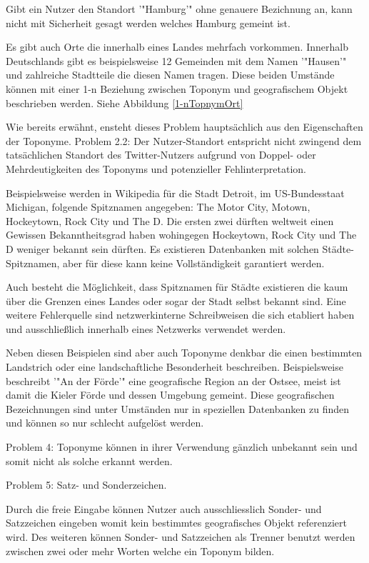 				Gibt ein Nutzer den Standort '"Hamburg'" ohne genauere Bezichnung an, kann nicht mit Sicherheit gesagt werden welches Hamburg gemeint ist.


				Es gibt auch Orte die innerhalb eines Landes mehrfach vorkommen.
				Innerhalb Deutschlands gibt es beispielsweise 12 Gemeinden mit dem Namen '"Hausen'" und zahlreiche Stadtteile die diesen Namen tragen.  
				Diese beiden Umstände können mit einer 1-n Beziehung zwischen Toponym und geografischem Objekt beschrieben werden.
				Siehe Abbildung \ref{1-nTopnymOrt} 

				Wie bereits erwähnt, ensteht dieses Problem hauptsächlich aus den Eigenschaften der Toponyme.
				Problem 2.2: Der Nutzer-Standort entspricht nicht zwingend dem tatsächlichen Standort des Twitter-Nutzers aufgrund von Doppel- oder Mehrdeutigkeiten des Toponyms und potenzieller Fehlinterpretation.
				

				Beispielsweise werden in Wikipedia für die Stadt Detroit, im US-Bundesstaat Michigan, folgende Spitznamen angegeben: The Motor City, Motown, Hockeytown, Rock City und The D. 
				Die ersten zwei dürften weltweit einen Gewissen Bekanntheitsgrad haben wohingegen Hockeytown, Rock City und The D weniger bekannt sein dürften.  
				Es existieren Datenbanken mit solchen Städte-Spitznamen, aber für diese kann keine Vollständigkeit garantiert werden. 
				
				Auch besteht die Möglichkeit, dass Spitznamen für Städte existieren die kaum über die Grenzen eines Landes oder sogar der Stadt selbst bekannt sind. 
				Eine weitere Fehlerquelle sind netzwerkinterne Schreibweisen die sich etabliert haben und ausschließlich innerhalb eines Netzwerks verwendet werden.

				Neben diesen Beispielen sind aber auch Toponyme denkbar die einen bestimmten Landstrich oder eine landschaftliche Besonderheit beschreiben.
				Beispielsweise beschreibt '"An der Förde'" eine geografische Region an der Ostsee, meist ist damit die Kieler Förde und dessen Umgebung gemeint. 
				Diese geografischen Bezeichnungen sind unter Umständen nur in speziellen Datenbanken zu finden und können so nur schlecht aufgelöst werden. 

				Problem 4: Toponyme können in ihrer Verwendung gänzlich unbekannt sein und somit nicht als solche erkannt werden.


				Problem 5: Satz- und Sonderzeichen.

				Durch die freie Eingabe können Nutzer auch ausschliesslich Sonder- und Satzzeichen eingeben womit kein bestimmtes geografisches Objekt referenziert wird. 
				Des weiteren können Sonder- und Satzzeichen als Trenner benutzt werden zwischen zwei oder mehr Worten welche ein Toponym bilden.
				
